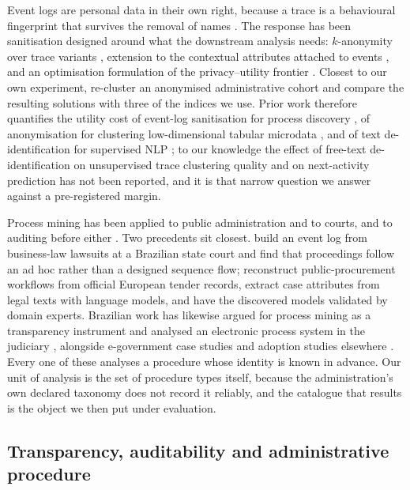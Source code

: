 Event logs are personal data in their own right, because a trace is a behavioural fingerprint that
survives the removal of names \citep{mannhardt2019privacy, elkoumy2022privacy}. The response has
been sanitisation designed around what the downstream analysis needs: $k$-anonymity over trace
variants \citep{fahrenkrogpetersen2019pretsa}, extension to the contextual attributes attached to
events \citep{fahrenkrogpetersen2020pripel}, and an optimisation formulation of the
privacy--utility frontier \citep{fahrenkrogpetersen2023optimal}. Closest to our own experiment,
\citet{ferrao2022utility} re-cluster an anonymised administrative cohort and compare the resulting
solutions with three of the indices we use. Prior work therefore quantifies the utility cost of
event-log sanitisation for process discovery \citep{fahrenkrogpetersen2019pretsa,
fahrenkrogpetersen2023optimal}, of anonymisation for clustering low-dimensional tabular microdata
\citep{ferrao2022utility}, and of text de-identification for supervised NLP
\citep{lothritz2023evaluating}; to our knowledge the effect of free-text de-identification on
unsupervised trace clustering quality and on next-activity prediction has not been reported, and
it is that narrow question we answer against a pre-registered margin.

Process mining has been applied to public administration and to courts, and to auditing before
either \citep{vanderaalst2010auditing, jans2014fieldstudy}. Two precedents sit closest.
\citet{unger2021jurimetrics} build an event log from business-law lawsuits at a Brazilian state
court and find that proceedings follow an ad hoc rather than a designed sequence flow;
\citet{nai2026procurement} reconstruct public-procurement workflows from official European tender
records, extract case attributes from legal texts with language models, and have the discovered
models validated by domain experts. Brazilian work has likewise argued for process mining as a
transparency instrument and analysed an electronic process system in the judiciary
\citep{araujo2023mineracao, limaesilva2026analise}, alongside e-government case studies and
adoption studies elsewhere \citep{delgado2022discovery, racis2025donot, trottier2025using}. Every
one of these analyses a procedure whose identity is known in advance. Our unit of analysis is the
set of procedure types itself, because the administration's own declared taxonomy does not record
it reliably, and the catalogue that results is the object we then put under evaluation.

\subsection{Transparency, auditability and administrative procedure}\label{subsec:rw-legal}

